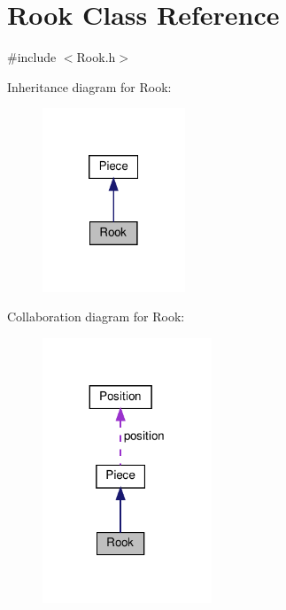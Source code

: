 \hypertarget{class_rook}{}\section{Rook Class Reference}
\label{class_rook}


{\ttfamily \#include $<$Rook.\+h$>$}



Inheritance diagram for Rook\+:\nopagebreak
\begin{figure}[H]
\begin{center}
\leavevmode
\includegraphics[width=121pt]{class_rook__inherit__graph}
\end{center}
\end{figure}


Collaboration diagram for Rook\+:\nopagebreak
\begin{figure}[H]
\begin{center}
\leavevmode
\includegraphics[width=143pt]{class_rook__coll__graph}
\end{center}
\end{figure}
